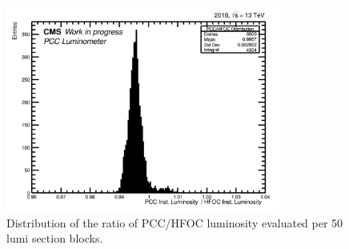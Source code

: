 \begin{itemize}
\begin{figure}[!htp]
\centering
\includegraphics[width=0.8\textwidth]{ashish_thesis/ProjY_ProfileX_h_ratio_all_1.png}
\caption[Projection of luminosity ratio profile]{%
Distribution of the ratio of PCC/HFOC luminosity evaluated per 50 lumi section blocks. 
}
\label{fig:stabprof1}
\end{figure}
  


\end{itemize}
